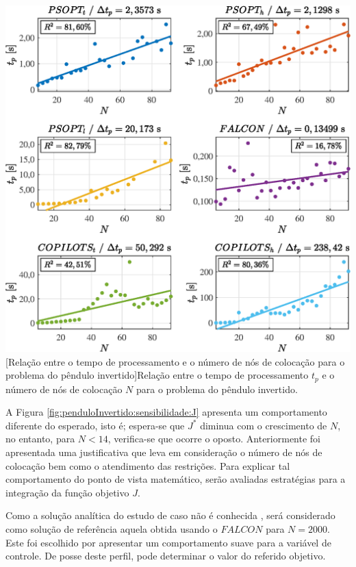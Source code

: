 \noindent
\begin{minipage}{\textwidth}
	\vspace{\onelineskip}
	\centering
	\includegraphics[scale=0.7]{fig/resultados/penduloInvertido/sens/t}
	[Relação entre o tempo de processamento e o número de nós de colocação para o problema do pêndulo invertido]{Relação entre o tempo de processamento $ t_p $ e o número de nós de colocação $ N $ para o problema do pêndulo invertido.}
	\label{fig:penduloInvertido:sensibilidade:t}
	\vspace{\onelineskip}
\end{minipage}

A Figura \ref{fig:penduloInvertido:sensibilidade:J} apresenta um comportamento diferente do esperado, isto é; espera-se que $ J^* $ diminua com o crescimento de $ N $, no entanto, para $ N < 14 $, verifica-se que ocorre o oposto. Anteriormente foi apresentada uma justificativa que leva em consideração o número de nós de colocação bem como o atendimento das restrições. Para explicar tal comportamento do ponto de vista matemático, serão avaliadas estratégias para a integração da função objetivo $ J $.   

Como a solução analítica do estudo de caso não é conhecida  \cite{kelly_introduction_2017}, será considerado como solução de referência aquela obtida usando o $ FALCON $ para $ N = 2000 $. Este foi escolhido por apresentar um comportamento suave para a variável de controle. De posse deste perfil, pode determinar o valor do referido objetivo.

